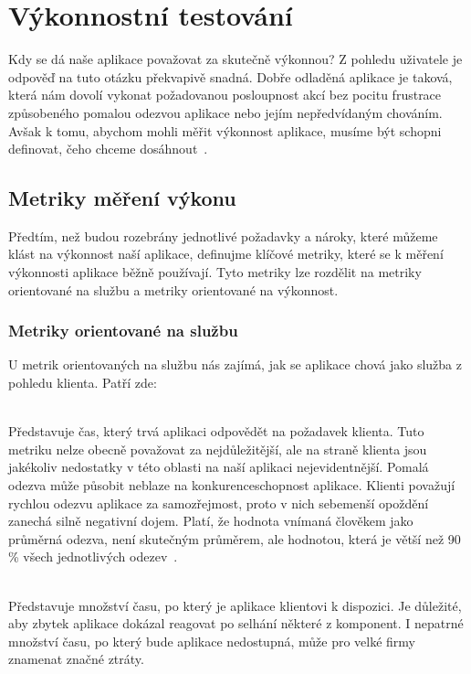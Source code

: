 \documentclass[122pt,oneside]{fithesis}
\begin{document}
\chapter{Výkonnostní testování}

Kdy se dá naše aplikace považovat za skutečně výkonnou? Z pohledu uživatele je odpověď na tuto otázku překvapivě snadná. Dobře odladěná aplikace je taková, která nám dovolí vykonat požadovanou posloupnost akcí bez pocitu frustrace způsobeného pomalou odezvou aplikace nebo jejím nepředvídaným chováním. Avšak k tomu, abychom mohli měřit výkonnost aplikace, musíme být schopni definovat, čeho chceme dosáhnout~\cite{molyneaux09}.

\section{Metriky měření výkonu}
Předtím, než budou rozebrány jednotlivé požadavky a nároky, které můžeme klást na výkonnost naší aplikace, definujme klíčové metriky, které se k měření výkonnosti aplikace běžně používají. Tyto metriky lze rozdělit na metriky orientované na službu a metriky orientované na výkonnost.
\subsection{Metriky orientované na službu}
U metrik orientovaných na službu nás zajímá, jak se aplikace chová jako služba z pohledu klienta. Patří zde: 

\vspace{5 mm}
\\\indent Představuje čas, který trvá aplikaci odpovědět na požadavek klienta. Tuto metriku nelze obecně považovat za nejdůležitější, ale na straně klienta jsou jakékoliv nedostatky v této oblasti na naší aplikaci nejevidentnější. Pomalá odezva může působit neblaze na konkurenceschopnost aplikace. Klienti považují rychlou odezvu aplikace za samozřejmost, proto v nich sebemenší opoždění zanechá silně negativní dojem. Platí, že hodnota vnímaná člověkem jako průměrná odezva, není skutečným průměrem, ale hodnotou, která je větší než 90 \% všech jednotlivých odezev~\cite{haines06}.

\vspace{5 mm}
\\\indent Představuje množství času, po který je aplikace klientovi k dispozici. Je důležité, aby zbytek aplikace dokázal reagovat po selhání některé z komponent. I nepatrné množství času, po který bude aplikace nedostupná, může pro velké firmy znamenat značné ztráty.
\end{document}
